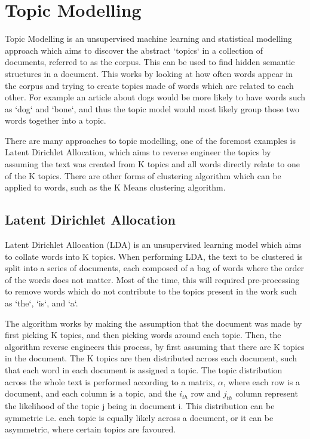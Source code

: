 \section{Topic Modelling}
Topic Modelling is an unsupervised machine learning and statistical modelling approach which aims to discover the abstract `topics` in a collection of documents, referred to as the corpus. This can be used to find hidden semantic structures in a document. This works by looking at how often words appear in the corpus and trying to create topics made of words which are related to each other. For example an article about dogs would be more likely to have words such as `dog` and `bone`, and thus the topic model would most likely group those two words together into a topic. 

There are many approaches to topic modelling, one of the foremost examples is Latent Dirichlet Allocation, which aims to reverse engineer the topics by assuming the text was created from K topics and all words directly relate to one of the K topics. There are other forms of clustering algorithm which can be applied to words, such as the K Means clustering algorithm. 

\subsection{Latent Dirichlet Allocation}
Latent Dirichlet Allocation (LDA) is an unsupervised learning model which aims to collate words into K topics. When performing LDA, the text to be clustered is split into a series of documents, each composed of a bag of words where the order of the words does not matter. Most of the time, this will required pre-processing to remove words which do not contribute to the topics present in the work such as `the`, `is`,  and `a`. 

\noindent The algorithm works by making the assumption that the document was made by first picking K topics, and then picking words around each topic. Then, the algorithm reverse engineers this process, by first assuming that there are K topics in the document. The K topics are then distributed across each document, such that each word in each document is assigned a topic. The topic distribution across the whole text is performed according to a matrix, $\alpha$,  where each row is a document, and each column is a topic, and the $i_{th}$ row and $j_{th}$ column represent the likelihood of the topic j being in document i. This distribution can be symmetric i.e. each topic is equally likely across a document, or it can be asymmetric, where certain topics are favoured.

